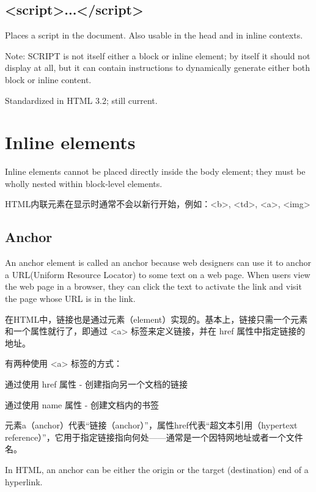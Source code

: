 \subsection{<script>...</script>}

Places a script in the document. Also usable in the head and in inline contexts.

Note: SCRIPT is not itself either a block or inline element; by itself it should not display at all, but it can contain instructions to dynamically generate either both block or inline content.

Standardized in HTML 3.2; still current.


\section{Inline elements}

Inline elements cannot be placed directly inside the body element; they must be wholly nested within block-level elements.

HTML内联元素在显示时通常不会以新行开始，例如：<b>, <td>, <a>, <img>


\subsection{Anchor}

An anchor element is called an anchor because web designers can use it to anchor a URL(Uniform Resource Locator) to some text on a web page. When users view the web page in a browser, they can click the text to activate the link and visit the page whose URL is in the link.

在HTML中，链接也是通过元素（element）实现的。基本上，链接只需一个元素和一个属性就行了，即通过 <a> 标签来定义链接，并在 href 属性中指定链接的地址。

有两种使用 <a> 标签的方式：

\begin{compactitem}
\item 通过使用 href 属性 - 创建指向另一个文档的链接
\item 通过使用 name 属性 - 创建文档内的书签
\end{compactitem}

元素a（anchor）代表“链接（anchor）”，属性href代表“超文本引用（hypertext reference）”，它用于指定链接指向何处——通常是一个因特网地址或者一个文件名。



In HTML, an anchor can be either the origin or the target (destination) end of a hyperlink.

